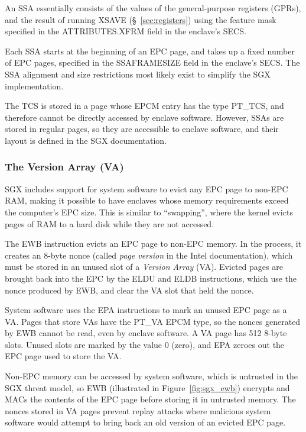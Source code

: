 An SSA essentially consists of the values of the general-purpose registers
(GPRs), and the result of running XSAVE (\S~\ref{sec:registers}) using the
feature mask specified in the ATTRIBUTES.XFRM field in the enclave's SECS.


Each SSA starts at the beginning of an EPC page, and takes up a fixed number of
EPC pages, specified in the SSAFRAMESIZE field in the enclave's SECS. The SSA
alignment and size restrictions most likely exist to simplify the SGX
implementation.

The TCS is stored in a page whose EPCM entry has the type PT\_TCS, and
therefore cannot be directly accessed by enclave software. However, SSAs are
stored in regular pages, so they are accessible to enclave software, and their
layout is defined in the SGX documentation.

\subsubsection{The Version Array (VA)}
\label{sec:va}

SGX includes support for system software to evict any EPC page to non-EPC RAM,
making it possible to have enclaves whose memory requirements exceed the
computer's EPC size. This is similar to ``swapping'', where the kernel evicts
pages of RAM to a hard disk while they are not accessed.


The EWB instruction evicts an EPC page to non-EPC memory. In the process, it
creates an 8-byte nonce (called \textit{page version} in the Intel
documentation), which must be stored in an unused slot of a \textit{Version
Array} (VA). Evicted pages are brought back into the EPC by the ELDU and ELDB
instructions, which use the nonce produced by EWB, and clear the VA slot that
held the nonce.

System software uses the EPA instructions to mark an unused EPC page as a VA.
Pages that store VAs have the PT\_VA EPCM type, so the nonces generated by EWB
cannot be read, even by enclave software.  A VA page has 512 8-byte slots.
Unused slots are marked by the value 0 (zero), and EPA zeroes out the EPC page
used to store the VA.

Non-EPC memory can be accessed by system software, which is untrusted in the
SGX threat model, so EWB (illustrated in Figure~\ref{fig:sgx_ewb}) encrypts and
MACs the contents of the EPC page before storing it in untrusted memory. The
nonces stored in VA pages prevent replay attacks where malicious system
software would attempt to bring back an old version of an evicted EPC page.



